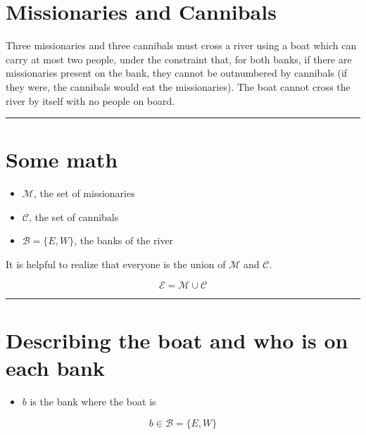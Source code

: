 \documentclass{article}
\begin{document}
\section{Missionaries and Cannibals}\label{missionaries-and-cannibals}

Three missionaries and three cannibals must cross a river using a boat
which can carry at most two people, under the constraint that, for both
banks, if there are missionaries present on the bank, they cannot be
outnumbered by cannibals (if they were, the cannibals would eat the
missionaries). The boat cannot cross the river by itself with no people
on board.

\begin{center}\rule{0.5\linewidth}{0.5pt}\end{center}

\section{Some math}\label{some-math}

\begin{itemize}

\item
  \(\mathcal{M}\), the set of missionaries
\item
  \(\mathcal{C}\), the set of cannibals
\item
  \(\mathcal{B} = \{ E, W \}\), the banks of the river
\end{itemize}

It is helpful to realize that everyone is the union of \(\mathcal{M}\)
and \(\mathcal{C}\).

\[\mathcal{E} = \mathcal{M} \cup \mathcal{C}\]

\begin{center}\rule{0.5\linewidth}{0.5pt}\end{center}

\section{Describing the boat and who is on each
bank}\label{describing-the-boat-and-who-is-on-each-bank}

\begin{itemize}

\item
  \(b\) is the bank where the boat is
\end{itemize}

\[b \in \mathcal{B} = \{ E, W \}\]
\end{document}
